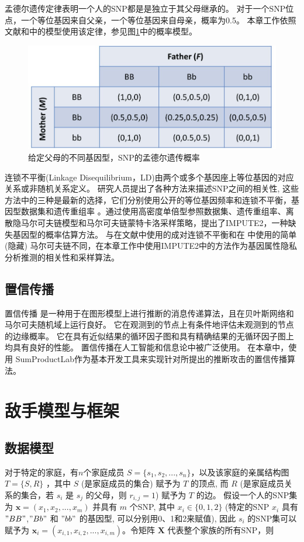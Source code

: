孟德尔遗传定律表明一个人的SNP都是是独立于其父母继承的。 对于一个SNP位点，一个等位基因来自父亲，一个等位基因来自母亲，概率为0.5。 本章工作依照文献\cite{humbert2013addressing}和\cite{deznabi2018inference}中的模型使用该定律，参见图\ref{fig:Mendelian-law}中的概率模型。

\begin{figure}[htbp]
	\centering
	\includegraphics[width=0.6\linewidth]{./figures/Mendelian-law.jpg}
	\centering
	\caption{给定父母的不同基因型，SNP的孟德尔遗传概率}\label{fig:Mendelian-law}
\end{figure}

连锁不平衡(Linkage Disequilibrium，LD)由两个或多个基因座上等位基因的对应关系或非随机关系定义。 研究人员提出了各种方法来描述SNP之间的相关性, 这些方法中的三种是最新的选择，它们分别使用公开的等位基因频率和连锁不平衡，基因型数据集和遗传重组率\cite{samani2015quantifying} 。通过使用高密度单倍型参照数据集、遗传重组率、离散隐马尔可夫链模型和马尔可夫链蒙特卡洛采样策略，提出了IMPUTE2\cite{howie2014impute2}，一种缺失基因型的概率估算方法。 与在文献\cite{humbert2013addressing,humbert2017quantifying}中使用的成对连锁不平衡和在\cite{deznabi2018inference} 中使用的简单(隐藏) 马尔可夫链不同，在本章工作中使用IMPUTE2中的方法作为基因属性隐私分析推测的相关性和采样算法。

\subsection{置信传播}

置信传播\cite{kschischang2001factor} 是一种用于在图形模型上进行推断的消息传递算法，且在贝叶斯网络和马尔可夫随机域上运行良好。 它在观测到的节点上有条件地评估未观测到的节点的边缘概率。 它在具有近似结果的循环因子图和具有精确结果的无循环因子图上均具有良好的性能。 置信传播在人工智能和信息论中被广泛使用。 在本章中，使用 SumProductLab作为基本开发工具来实现针对所提出的推断攻击的置信传播算法。

\section{敌手模型与框架}
\subsection{数据模型}
对于特定的家庭，有$n$个家庭成员 $S=\{s_1,s_2,...,s_n\}$，以及该家庭的亲属结构图 $T=\{S,R\}$ ，其中 $S$ (是家庭成员的集合) 赋予为 $T$ 的顶点, 而 $R$ (是家庭成员关系的集合，若 $s_i$ 是 $s_j$ 的父母，则 $r_{i,j}=1$) 赋予为 $T$ 的边。 假设一个人的SNP集为 $\mathbf{x}=(x_1,x_2,...,x_m)$ 并具有 $m$ 个SNP, 其中 $x_i \in \{0,1,2\}$ (特定的SNP $x_i$ 具有 $"BB"$,$"Bb"$ 和 $"bb"$ 的基因型, 可以分别用0、1和2来赋值), 因此 $s_i$ 的SNP集可以赋予为 $\mathbf{x}_i=(x_{i,1},x_{i,2},...,x_{i,m})$。令矩阵 $\mathbf{X}$ 代表整个家族的所有SNP，则

